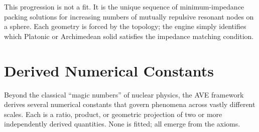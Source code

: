 This progression is not a fit. It is the unique sequence of minimum-impedance packing solutions for increasing numbers of mutually repulsive resonant nodes on a sphere. Each geometry is forced by the topology; the engine simply identifies which Platonic or Archimedean solid satisfies the impedance matching condition.

\section{Derived Numerical Constants}
\label{sec:derived_numerology}

Beyond the classical ``magic numbers'' of nuclear physics, the AVE
framework derives several numerical constants that govern phenomena
across vastly different scales.  Each is a ratio, product, or
geometric projection of two or more independently derived quantities.
None is fitted; all emerge from the axioms.

